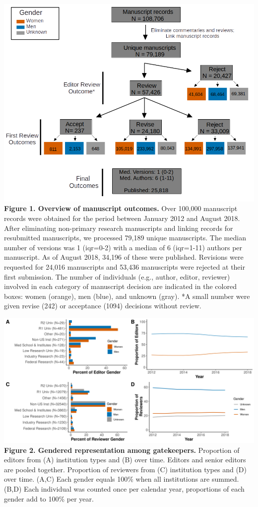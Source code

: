 \documentclass[11pt,]{article}
\begin{document}
\newpage

\includegraphics{population_diagram.png} \textbf{Figure 1. Overview of
manuscript outcomes.} Over 100,000 manuscript records were obtained for
the period between January 2012 and August 2018. After eliminating
non-primary research manuscripts and linking records for resubmitted
manuscripts, we processed 79,189 unique manuscripts. The median number
of versions was 1 (iqr=0-2) with a median of 6 (iqr=1-11) authors per
manuscript. As of August 2018, 34,196 of these were published. Revisions
were requested for 24,016 manuscripts and 53,436 manuscripts were
rejected at their first submission. The number of individuals (e.g.,
author, editor, reviewer) involved in each category of manuscript
decision are indicated in the colored boxes: women (orange), men (blue),
and unknown (gray). *A small number were given revise (242) or
acceptance (1094) decisions without review.

\newpage

\includegraphics{Figure_1.png} \textbf{Figure 2. Gendered representation
among gatekeepers.} Proportion of editors from (A) institution types and
(B) over time. Editors and senior editors are pooled together.
Proportion of reviewers from (C) institution types and (D) over time.
(A,C) Each gender equals 100\% when all institutions are summed.(B,D)
Each individual was counted once per calendar year, proportions of each
gender add to 100\% per year.
\end{document}
